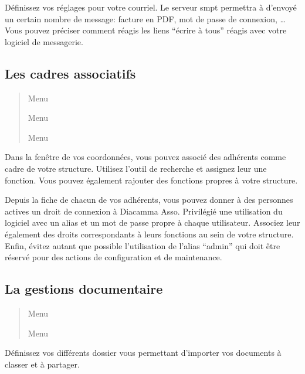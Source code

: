 \documentclass[a4paper,10pt,oneside,french]{sphinxmanual}
\begin{document}
Définissez vos réglages pour votre courriel.
Le serveur smpt permettra à  d’envoyé un certain nombre de message: facture en PDF, mot de passe de connexion, …
Vous pouvez préciser comment réagis les liens “écrire à tous” réagis avec votre logiciel de messagerie.


\subsection{Les cadres associatifs}
\label{\detokenize{asso/first_step:les-cadres-associatifs}}\begin{quote}

Menu 

Menu 

Menu 
\end{quote}

Dans la fenêtre de vos coordonnées, vous pouvez associé des adhérents comme cadre de votre structure.
Utilisez l’outil de recherche et assignez leur une fonction.
Vous pouvez également rajouter des fonctions propres à votre structure.

Depuis la fiche de chacun de vos adhérents, vous pouvez donner à des personnes actives un droit de connexion à Diacamma Asso.
Privilégié une utilisation du logiciel avec un alias et un mot de passe propre à chaque utilisateur. Associez leur également des droits correspondants à leurs fonctions au sein de votre structure.
Enfin, évitez autant que possible l’utilisation de l’alias “admin” qui doit être réservé pour des actions de configuration et de maintenance.


\subsection{La gestions documentaire}
\label{\detokenize{asso/first_step:la-gestions-documentaire}}\begin{quote}

Menu 

Menu 
\end{quote}

Définissez vos différents dossier vous permettant d’importer vos documents à classer et à partager.
\end{document}

